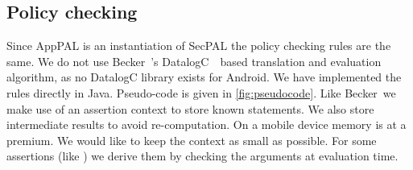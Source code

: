 \documentclass[]{llncs}
\begin{document}
%
%

\subsection{Policy checking}
\label{ssec:eval}

Since AppPAL is an instantiation of SecPAL the policy checking rules are the same.
We do not use Becker~\etal's DatalogC~\cite{Li:2003ix}~based translation and evaluation algorithm, as no DatalogC library exists for Android.
We have implemented the rules directly in Java.
Pseudo-code is given in \autoref{fig:pseudocode}.
Like Becker~\etal we make use of an assertion context to store known statements.
We also store intermediate results to avoid re-computation.
On a mobile device memory is at a premium.
We would like to keep the context as small as possible.
For some assertions (like ) we derive them by checking the arguments at evaluation time.
\end{document}
